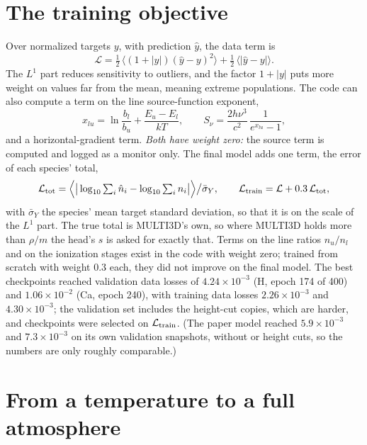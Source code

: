 \section{The training objective}\label{sec:objective}
Over normalized targets $y$, with prediction $\hat y$, the data term is
\begin{equation}
\mathcal L=\tfrac12\,\big\langle(1+|y|)(\hat y-y)^2\big\rangle+\tfrac12\,\big\langle|\hat y-y|\big\rangle .
\end{equation}
The $L^1$ part reduces sensitivity to outliers, and the factor $1+|y|$ puts more weight on values far from the mean, meaning extreme populations. The code can also compute a term on the line source-function exponent,
\begin{equation}
x_{lu}=\ln\frac{b_l}{b_u}+\frac{E_u-E_l}{kT},\qquad S_\nu=\frac{2h\nu^3}{c^2}\,\frac{1}{e^{x_{lu}}-1},
\end{equation}
and a horizontal-gradient term. \emph{Both have weight zero:} the source term is computed and logged as a monitor only. The final model adds one term, the error of each species' total,
\begin{equation}
\mathcal L_{\rm tot}=\Big\langle\big|\log_{10}\textstyle\sum_i\hat n_i-\log_{10}\sum_in_i\big|\Big\rangle\big/\bar\sigma_Y,\qquad \mathcal L_{\rm train}=\mathcal L+0.3\,\mathcal L_{\rm tot},
\end{equation}
with $\bar\sigma_Y$ the species' mean target standard deviation, so that it is on the scale of the $L^1$ part. The true total is MULTI3D's own, so where MULTI3D holds more than $\rho/m$ the head's $s$ is asked for exactly that. Terms on the line ratios $n_u/n_l$ and on the ionization stages exist in the code with weight zero; trained from scratch with weight 0.3 each, they did not improve on the final model. The best checkpoints reached validation data losses of $4.24\times10^{-3}$ (H, epoch 174 of 400) and $1.06\times10^{-2}$ (Ca, epoch 240), with training data losses $2.26\times10^{-3}$ and $4.30\times10^{-3}$; the validation set includes the height-cut copies, which are harder, and checkpoints were selected on $\mathcal L_{\rm train}$. (The paper model reached $5.9\times10^{-3}$ and $7.3\times10^{-3}$ on its own validation snapshots, without  or height cuts, so the numbers are only roughly comparable.)

\section{From a temperature to a full atmosphere}\label{sec:equilibrium}

